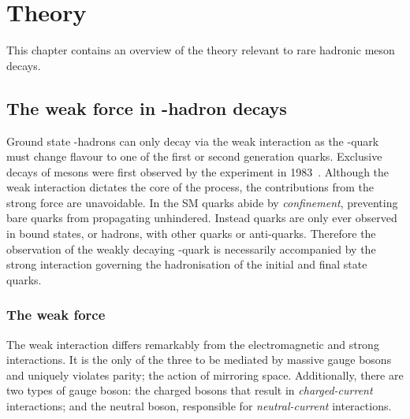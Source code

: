 \chapter{Theory} 
\label{ch:theory}

\minitoc


This chapter contains an overview of the theory relevant to rare hadronic \B meson decays.





\section{The weak force in \bquark-hadron decays}

Ground state \bquark-hadrons can only decay via the weak interaction as the \bquark-quark must change flavour to one of the first or second generation quarks.
Exclusive decays of \B mesons were first observed by the \cleo experiment in 1983~\cite{PhysRevLett.50.881}. Although the weak interaction dictates the core of the process, the contributions from the strong force are unavoidable. In the SM quarks abide by \emph{confinement}, preventing bare quarks from propagating unhindered. Instead quarks are only ever observed in bound states, or hadrons, with other quarks or anti-quarks. Therefore the observation of the weakly decaying \bquark-quark is necessarily accompanied by the strong interaction governing the hadronisation of the initial and final state quarks.


\subsection{The weak force}

The weak interaction differs remarkably from the electromagnetic and strong interactions. It is the only of the three to be mediated by massive gauge bosons and uniquely violates parity; the action of mirroring space. 
Additionally, there are two types of gauge boson: the charged \Wpm bosons that result in \emph{charged-current} interactions; and the neutral \Z boson, responsible for \emph{neutral-current} interactions. 

